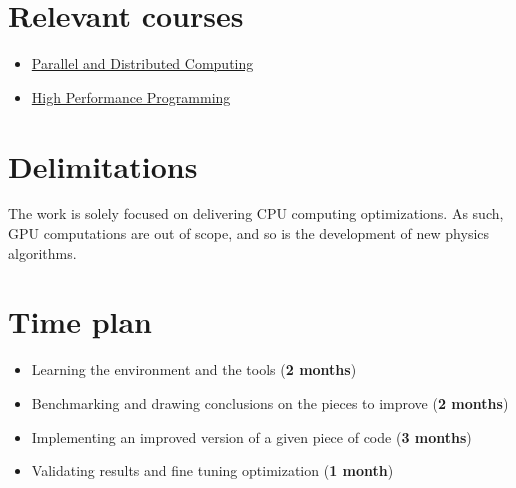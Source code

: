 \documentclass[12pt]{article}
\begin{document}
	\newpage
	\section{Relevant courses}
	
	\begin{itemize}
		\item \href{http://www.uu.se/en/admissions/master/selma/kursplan/?kpid=31898&type=1}
			{Parallel and Distributed Computing}
		
		\item \href{http://www.uu.se/en/admissions/master/selma/kursplan/?kpid=31897&lasar=18%2F19&typ=1}
			{High Performance Programming}	
	\end{itemize}



	
	
	
	\section{Delimitations}

	The work is solely focused on delivering CPU computing optimizations. As such, GPU computations are out of scope, and so is the development of new physics algorithms.
	


	\section{Time plan}
		
	\begin{itemize}
		\item Learning the environment and the tools (\textbf{2 months})
		\item Benchmarking and drawing conclusions on the pieces to improve (\textbf{2 months})
		\item Implementing an improved version of a given piece of code (\textbf{3 months})
		\item Validating results and fine tuning optimization (\textbf{1 month})
	\end{itemize}
\end{document}

